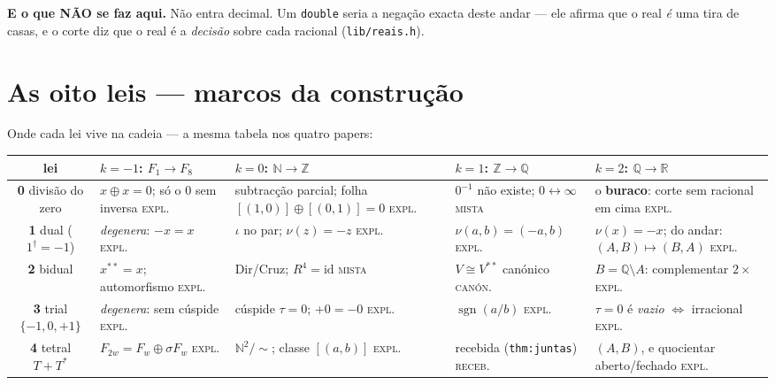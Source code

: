 \documentclass[11pt,a4paper]{article}
\newcommand{\code}[1]{\texttt{\small #1}}
\newcommand{\dg}{^{\dagger}}
\begin{document}
\medskip\noindent\textbf{E o que NÃO se faz aqui.} Não entra decimal. Um
\code{double} seria a negação exacta deste andar --- ele afirma que o real
\emph{é} uma tira de casas, e o corte diz que o real é a \emph{decisão} sobre
cada racional (\code{lib/reais.h}).

\section{As oito leis --- marcos da construção}\label{sec:leis}

\noindent Onde cada lei vive na cadeia --- a mesma tabela nos quatro papers:

\begin{center}\footnotesize
\begin{tabular}{@{}cp{2.75cm}p{2.75cm}p{2.75cm}p{2.75cm}@{}}
\toprule
lei & $k{=}-1$: $F_1\!\to\!F_8$ & $k{=}0$: $\mathbb{N}\!\to\!\mathbb{Z}$ & $k{=}1$: $\mathbb{Z}\!\to\!\mathbb{Q}$ & $k{=}2$: $\mathbb{Q}\!\to\!\mathbb{R}$ \\
\midrule
\textbf{0} divisão do zero
 & $x\oplus x=0$; só o $0$ sem inversa \hfill\textsc{expl.}
 & subtracção parcial; folha $[(1,0)]\oplus[(0,1)]=0$ \hfill\textsc{expl.}
 & $0^{-1}$ não existe; $0\!\leftrightarrow\!\infty$ \hfill\textsc{mista}
 & o \textbf{buraco}: corte sem racional em cima \hfill\textsc{expl.} \\
\textbf{1} dual ($1\dg=-1$)
 & \emph{degenera}: $-x=x$ \hfill\textsc{expl.}
 & $\iota$ no par; $\nu(z)=-z$ \hfill\textsc{expl.}
 & $\nu(a,b)=(-a,b)$ \hfill\textsc{expl.}
 & $\nu(x)=-x$; do andar: $(A,B)\!\mapsto\!(B,A)$ \hfill\textsc{expl.} \\
\textbf{2} bidual
 & $x^{**}=x$; automorfismo \hfill\textsc{expl.}
 & Dir/Cruz; $R^{4}=\mathrm{id}$ \hfill\textsc{mista}
 & $V\cong V^{**}$ canónico \hfill\textsc{canón.}
 & $B=\mathbb{Q}\setminus A$: complementar $2\times$ \hfill\textsc{expl.} \\
\textbf{3} trial $\{-1,0,+1\}$
 & \emph{degenera}: sem cúspide \hfill\textsc{expl.}
 & cúspide $\tau=0$; $+0=-0$ \hfill\textsc{expl.}
 & $\operatorname{sgn}(a/b)$ \hfill\textsc{expl.}
 & $\tau=0$ é \emph{vazio} $\iff$ irracional \hfill\textsc{expl.} \\
\textbf{4} tetral $T+T^{*}$
 & $F_{2w}=F_w\oplus\sigma F_w$ \hfill\textsc{expl.}
 & $\mathbb{N}^{2}/{\sim}$; classe $[(a,b)]$ \hfill\textsc{expl.}
 & recebida (\code{thm:juntas}) \hfill\textsc{receb.}
 & $(A,B)$, e quocientar aberto/fechado \hfill\textsc{expl.} \\

\end{tabular}
\end{center}
\end{document}
